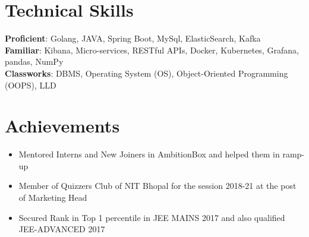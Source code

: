 \documentclass[letterpaper,11pt]{article}
\newcommand{\resumeItem}[1]{
  \item\small{
    {#1 \vspace{-2pt}}
  }
}
\newcommand{\resumeSubHeadingListStart}{\begin{itemize}[leftmargin=0.15in, label={}]}
\newcommand{\resumeSubHeadingListEnd}{\end{itemize}}
\newcommand{\resumeItemListStart}{\begin{itemize}}
\newcommand{\resumeItemListEnd}{\end{itemize}\vspace{-5pt}}
\begin{document}
%
\section{Technical Skills}
 \begin{itemize}[leftmargin=0.15in, label={}]
    \small{\item{
     \textbf{Proficient}{: Golang, JAVA, Spring Boot, MySql, ElasticSearch, Kafka} \\
     \textbf{Familiar}{: Kibana, Micro-services, RESTful APIs, Docker, Kubernetes, Grafana, pandas, NumPy} \\
     \textbf{Classworks}{: DBMS, Operating System (OS), Object-Oriented Programming (OOPS), LLD} \\
    }}
 \end{itemize}


 
%

\section{Achievements}
    \resumeSubHeadingListStart
       \resumeItemListStart
        \resumeItem{Mentored Interns and New Joiners in AmbitionBox and helped them in ramp-up}
        \resumeItem{Member of Quizzers Club of NIT Bhopal for the session 2018-21 at the post of Marketing Head}
        \resumeItem{Secured Rank in Top 1 percentile in JEE MAINS 2017 and also qualified JEE-ADVANCED 2017}
      \resumeItemListEnd
    \resumeSubHeadingListEnd


%
\end{document}
